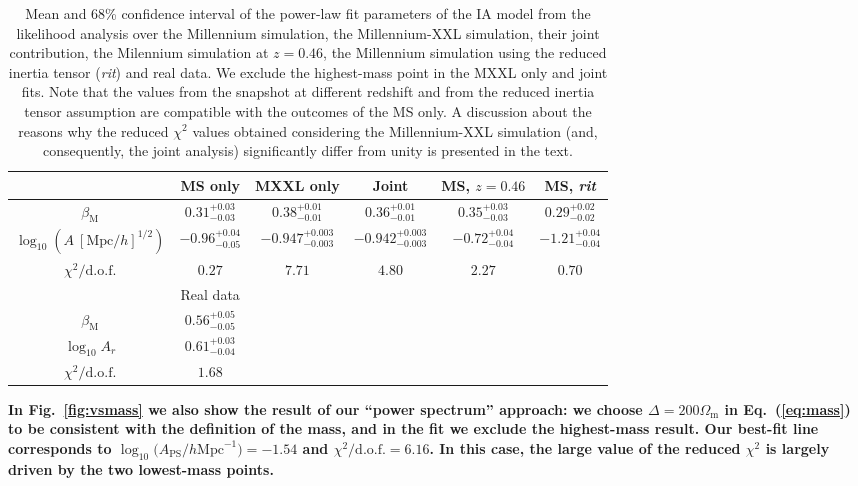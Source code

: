 \documentclass[a4paper,fleqn,usenatbib]{mnras}
\newenvironment{correction}
 {\bfseries}%
  {}%
\begin{document}
\begin{table*}
	\centering
	\caption{Mean and 68\% confidence interval of the power-law fit parameters of the IA model from the likelihood analysis over the Millennium simulation, the Millennium-XXL simulation, their joint contribution, the Milennium simulation at $z = 0.46$, the Millennium simulation using the reduced inertia tensor (\textit{rit}) and real data. We exclude the highest-mass point in the MXXL only and joint fits. Note that the values from the snapshot at different redshift and from the reduced inertia tensor assumption are compatible with the outcomes of the MS only. A discussion about the reasons why the reduced $\chi^2$ values obtained considering the Millennium-XXL simulation (and, consequently, the joint analysis) significantly differ from unity is presented in the text.}
	\label{tab:param}
	\begin{correction}
	\begin{tabular}{c||ccccc} %
		\hline \hline
		\ & MS only & MXXL only & Joint & MS, $z=0.46$ & MS, \textit{rit} \\
		\hline
		$\beta_{\mathrm{M}}$					  & $0.31^{+0.03}_{-0.03}$   & $0.38^{+0.01}_{-0.01}$  & $0.36^{+0.01}_{-0.01}$ &  $0.35^{+0.03}_{-0.03}$ & $0.29^{+0.02}_{-0.02}$ \\
		$\log_{10} (A \ [\mathrm{Mpc}/h]^{1/2})$ & $-0.96^{+0.04}_{-0.05}$ & $-0.947^{+0.003}_{-0.003}$ & $-0.942^{+0.003}_{-0.003}$&$-0.72^{+0.04}_{-0.04}$&  $-1.21^{+0.04}_{-0.04}$\\
		$\chi^2 / \mathrm{d.o.f.}$			  & $0.27$                                 & $7.71$			 & $4.80$			    & $2.27$			      & $0.70$	 \\
		\hline \hline
		\ & Real data & \ & \ \\
		\hline
		$\beta_{\mathrm{M}}$ & $0.56^{+0.05}_{-0.05}$ & &\\
		$\log_{10} A_r $ & $0.61^{+0.03}_{-0.04}$ & & & & \\
		$\chi^2 / \mathrm{d.o.f.}$			  & $1.68$  & & & & \\
		\hline \hline 
		\end{tabular}
		\end{correction}
\end{table*}

\begin{correction}
In Fig.~\ref{fig:vsmass} we also show the result of our ``power spectrum'' approach: we choose $\Delta = 200\Omega_{\mathrm{m}}$ in Eq.~(\ref{eq:mass}) to be consistent with the definition of the mass, and in the fit we exclude the highest-mass result.
Our best-fit line corresponds to $\log_{10}{\big(A_\mathrm{PS}/h\mbox{Mpc}^{-1}\big)} =  -1.54$ and $\chi^2 / \mbox{d.o.f.} = 6.16$. In this case, the large value of the reduced $\chi^2$ is largely driven by the two lowest-mass points.
\end{correction}
\end{document}
